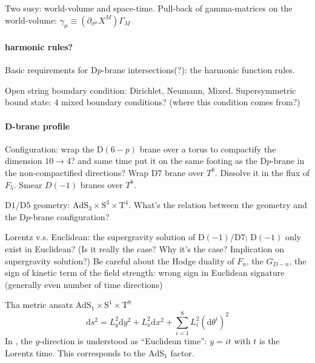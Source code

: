 Two susy: world-volume and space-time.
Pull-back of gamma-matrices on the world-volume:
$
	\gamma_\mu \equiv (\partial_{\sigma^\mu}
	X^M) \Gamma_M
$

\paragraph{harmonic rules?}
Basic requirements for D$p$-brane intersections(?):
the harmonic function rules.

Open string boundary condition: Dirichlet, Neumann, Mixed.
Supersymmetric bound state: $4$ mixed boundary conditions?
(where this condition comes from?)

\paragraph{D-brane profile}
Configuration: wrap the D$(6-p)$ brane over a torus to compactify the dimension $10\to 4$? and same time put it on the same footing as the D$p$-brane in the non-compactified directions?
Wrap D$7$ brane over $T^8$.
Dissolve it in the flux of $F_5$.
Smear $D(-1)$ branes over $T^8$.

D$1$/D$5$ geometry: 
$\mathrm{AdS}_3 \times \mathrm{S}^3 \times \mathrm{T}^4$.
What's the relation between the geometry and the D$p$-brane configuration?

Lorentz v.s. Euclidean: the supergravity solution of D$(-1)$/D$7$;
D$(-1)$ only exist in Euclidean?
(Is it really the case? Why it's the case? Implication on supergravity solution?)
Be careful about the Hodge duality of $F_n$, the $G_{D-n}$,
the sign of kinetic term of the field strength:
wrong sign in Euclidean signature (generally even number of time directions)

Tha metric ansatz $\mathrm{AdS}_1 \times \mathrm{S}^1 \times \mathrm{T}^8$
\begin{equation}
	\mathrm{d}s^2 = L_y^2 \mathrm{d}y^2 + L_x^2 \mathrm{d}x^2
	+ \sum_{i=1}^8 L_i^2 (\mathrm{d}\theta^i)^2	
\end{equation}
In , the $y$-direction is understood as ``Euclidean time'':
$ y = i t$ with $t$ is the Lorentz time.
This corresponds to the $\mathrm{AdS}_1$ factor.
